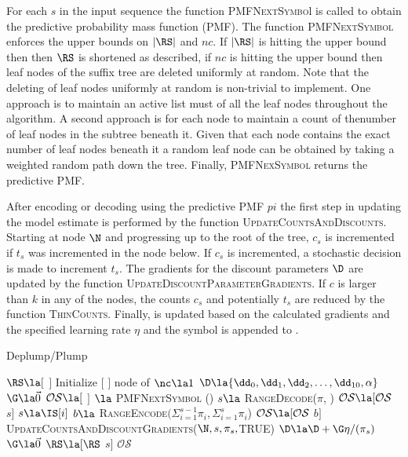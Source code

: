 For each $s$ in the input sequence the function \textsc{PMFNextSymbo}l is called to obtain the predictive probability mass function (PMF).  The function \textsc{PMFNextSymbol} enforces the upper bounds on $|\RS|$ and $nc$.  If  $|\RS|$ is hitting the upper bound then then $\RS$ is shortened as described, if $nc$ is hitting the upper bound then leaf nodes of the suffix tree are deleted uniformly at random.  Note that the deleting of leaf nodes uniformly at random is non-trivial to implement. One approach is to maintain an active list must of all the leaf nodes throughout the algorithm. A second approach is for each node to maintain a count of thenumber of leaf nodes in the subtree beneath it.  Given that each node contains the exact number of leaf nodes beneath it a random leaf node can be obtained by taking a weighted random path down the tree.  Finally, \textsc{PMFNexSymbol} returns the predictive PMF.

    After encoding or decoding using the predictive PMF $pi$ the first step in updating the model estimate is performed by the function \textsc{UpdateCountsAndDiscounts}.  Starting at node $\N$ and progressing up to the root of the tree, $c_s$ is incremented if $t_s$ was incremented in the node below.  If $c_s$ is incremented, a stochastic decision is made to increment $t_s$.  The gradients for the discount parameters $\D$ are updated by the function \textsc{UpdateDiscountParameterGradients}.  If $c$ is larger than $k$ in any of the nodes, the counts $c_s$ and potentially $t_s$ are reduced by the function \textsc{ThinCounts}. Finally, \D \space is updated based on the calculated gradients and the specified learning rate $\eta$ and the symbol is appended to \RS.

\begin{algorithm}
    \caption{Deplump/Plump} \label{deplump}
        
    \begin{algorithmic}[1]
		\State $\RS \la [$ $]  $ 
		\State Initialize $[$ $]$ node of \T {}
		\State $\nc \la 1$ 
		\State $\D \la  \{ \dd_0, \dd_1, \dd_2, \dots, \dd_{10}, \alpha \}$ 
		\State $\G \la \vec 0$ 
		\State $\mathcal{O}\mathcal{S} \la  [$ $]$ 
			\State [$\pi$, \N] $\la$ \textsc{PMFNextSymbol} (\RS)
				\State $s \la $ \textsc{RangeDecode}($\pi$, \IS)
				\State $\mathcal{O}\mathcal{S} \la [\mathcal{O}\mathcal{S}$ $s]$
			\Else
				\State $s \la \IS[i]$
				\State $b \la$ \textsc{RangeEncode}$(\Sigma_{i = 1}^{s-1} \pi_i, \Sigma_{i = 1}^{s} \pi_i$)
				\State $\mathcal{O}\mathcal{S} \la [\mathcal{O}\mathcal{S}$ $b]$		
			\EndIf
			\State \textsc{UpdateCountsAndDiscountGradients}($\N,s,\pi_s,$TRUE)
			\State $\D \la \D + \G \eta / (\pi_s)$ 
			\State $\G \la \vec 0$ 
			\State $\RS \la [\RS$ $s]$ 
		\EndFor
		\State \Return $\mathcal{O}\mathcal{S}$
	\EndProcedure
	\end{algorithmic}
\end{algorithm}


